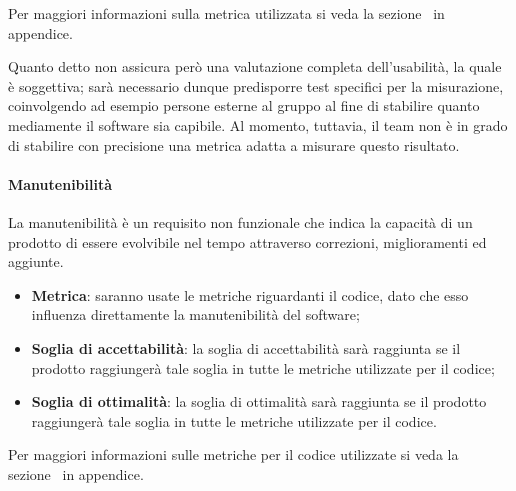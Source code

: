 Per maggiori informazioni sulla metrica utilizzata si veda la sezione~ in appendice.

Quanto detto non assicura però una valutazione completa dell'usabilità, la quale è soggettiva; sarà necessario dunque predisporre test specifici per la misurazione, coinvolgendo ad esempio persone esterne al gruppo al fine di stabilire quanto mediamente il software sia capibile. Al momento, tuttavia, il team non è in grado di stabilire con precisione una metrica adatta a misurare questo risultato.

\paragraph{Manutenibilità}
La manutenibilità è un requisito non funzionale che indica la capacità di un prodotto di essere evolvibile nel tempo attraverso correzioni, miglioramenti ed aggiunte.

	\begin{itemize}
	\item \textbf{Metrica}: saranno usate le metriche riguardanti il codice, dato che esso influenza direttamente la manutenibilità del software;
	\item \textbf{Soglia di accettabilità}: la soglia di accettabilità sarà raggiunta se il prodotto raggiungerà tale soglia in tutte le metriche utilizzate per il codice;
	\item \textbf{Soglia di ottimalità}: la soglia di ottimalità sarà raggiunta se il prodotto raggiungerà tale soglia in tutte le metriche utilizzate per il codice.
	\end{itemize}

Per maggiori informazioni sulle metriche per il codice utilizzate si veda la sezione~ in appendice.

